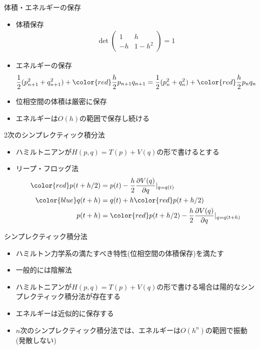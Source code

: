 \begin{frame}[t,fragile]{体積・エネルギーの保存}
  \begin{itemize}
    \setlength{\itemsep}{1em}
  \item 体積保存
    \begin{align*}
      \det \begin{pmatrix} 1 & h \\ -h & 1-h^2 \end{pmatrix} = 1
    \end{align*}
  \item エネルギーの保存
    \begin{align*}
      \frac{1}{2}(p_{n+1}^2+q_{n+1}^2) + {\color{red}\frac{h}{2} p_{n+1} q_{n+1}} = \frac{1}{2}(p_{n}^2+q_{n}^2) + {\color{red}\frac{h}{2} p_{n} q_{n}}
    \end{align*}
  \item 位相空間の体積は厳密に保存
  \item エネルギーは$O(h)$の範囲で保存し続ける
  \end{itemize}
\end{frame}

\begin{frame}[t,fragile]{2次のシンプレクティック積分法}
  \begin{itemize}
    \setlength{\itemsep}{1em}
  \item ハミルトニアンが$H(p,q) = T(p) + V(q)$の形で書けるとする
  \item リープ・フロッグ法
    \begin{align*}
      {\color{red} p(t+h/2)} &= p(t) - \frac{h}{2} \frac{\partial V(q)}{\partial q}|_{q=q(t)} \\
      {\color{blue} q(t+h)} &= q(t) + h {\color{red}p(t+h/2)} \\
      p(t+h) &= {\color{red}p(t+h/2}) - \frac{h}{2} \frac{\partial V(q)}{\partial q}|_{q=q(t+h)}
    \end{align*}
  \end{itemize}
\end{frame}

\begin{frame}[t,fragile]{シンプレクティック積分法}
  \begin{itemize}
    \setlength{\itemsep}{1em}
  \item ハミルトン力学系の満たすべき特性(位相空間の体積保存)を満たす
  \item 一般的には陰解法
  \item ハミルトニアンが$H(p,q) = T(p) + V(q)$の形で書ける場合は陽的なシンプレクティック積分法が存在する
  \item エネルギーは近似的に保存する
  \item $n$次のシンプレクティック積分法では、エネルギーは$O(h^n)$の範囲で振動(発散しない)
  \end{itemize}
\end{frame}
